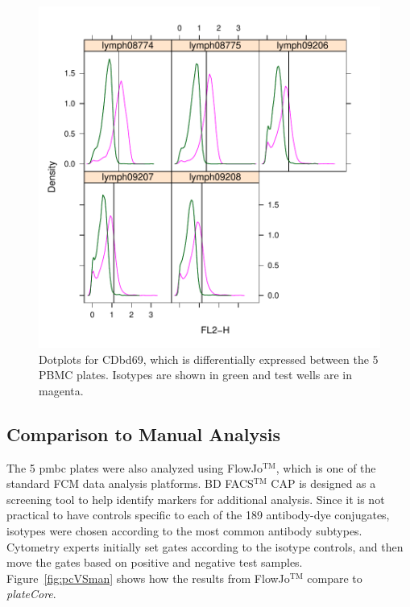 \documentclass[12pt]{article}
\newcommand{\Rpackage}[1]{{\textit{#1}}}
\begin{document}
\begin{figure}
\centering
\includegraphics{outline-pbmcCDbd69}
\caption{Dotplots for CDbd69, which is differentially expressed between the 5 PBMC plates. Isotypes are shown in green and
test wells are in magenta.}
\label{fig:pbmcCDbd69}
\end{figure}

\clearpage
\subsection*{Comparison to Manual Analysis}

The 5 pmbc plates were also analyzed using FlowJo$^{\text{TM}}$, which is one of the standard FCM data analysis platforms.
BD FACS$^{\text{TM}}$ CAP is designed as a screening tool to help identify markers for additional analysis. Since it is 
not practical to have controls specific to each of the 189 antibody-dye conjugates, isotypes were chosen according to the
most common antibody subtypes. Cytometry experts initially set gates according to the isotype controls, and then move the
gates based on positive and negative test samples. Figure~\ref{fig:pcVSman} shows how the results from FlowJo$^{\text{TM}}$ compare to \Rpackage{plateCore}.
\end{document}
